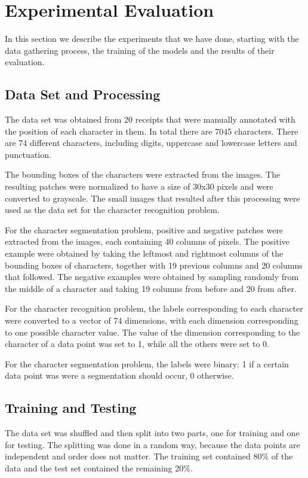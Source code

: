 \section{Experimental Evaluation}
\label{sec:exp}
In this section we describe the experiments that we have done, starting with the data gathering process, the training of the models and the results of their evaluation.

\subsection{Data Set and Processing}
The data set was obtained from 20 receipts that were manually annotated with the position of each character in them. In total there are 7045 characters. There are 74 different characters, including digits, uppercase and lowercase letters and punctuation. 

The bounding boxes of the characters were extracted from the images. The resulting patches were normalized to have a size of 30x30 pixels and were converted to grayscale. The small images that resulted after this processing were used as the data set for the character recognition problem.

For the character segmentation problem, positive and negative patches were extracted from the images, each containing 40 columns of pixels. The positive example were obtained by taking the leftmost and rightmost columns of the bounding boxes of characters, together with 19 previous columns and 20 columns that followed. The negative examples were obtained by sampling randomly from the middle of a character and taking 19 columns from before and 20 from after.

For the character recognition problem, the labels corresponding to each character were converted to a vector of 74 dimensions, with each dimension corresponding to one possible character value. The value of the dimension corresponding to the character of a data point was set to 1, while all the others were set to 0. 

For the character segmentation problem, the labels were binary: 1 if a certain data point was were a segmentation should occur, 0 otherwise. 

\subsection{Training and Testing}
The data set was shuffled and then split into two parts, one for training and one for testing. The splitting was done in a random way, because the data points are independent and order does not matter. The training set contained 80\% of the data and the test set contained the remaining 20\%. 

